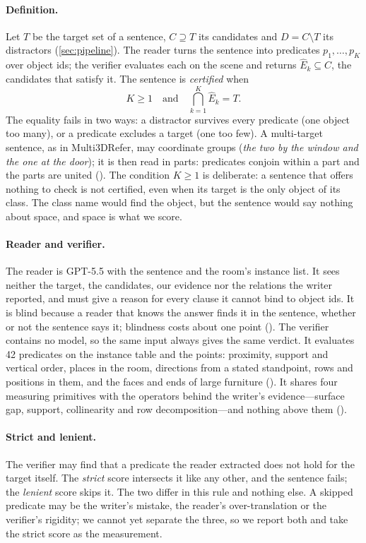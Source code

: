 \paragraph{Definition.}
Let $T$ be the target set of a sentence, $C \supseteq T$ its candidates and $D = C \setminus T$ its distractors (\cref{sec:pipeline}).
The reader turns the sentence into predicates $p_1,\dots,p_K$ over object ids; the verifier evaluates each on the scene and returns $\hat{E}_k \subseteq C$, the candidates that satisfy it.
The sentence is \emph{certified} when
\begin{equation}
  K \ge 1 \quad\text{and}\quad \bigcap_{k=1}^{K} \hat{E}_k = T .
  \label{eq:exact}
\end{equation}
The equality fails in two ways: a distractor survives every predicate (one object too many), or a predicate excludes a target (one too few).
A multi-target sentence, as in Multi3DRefer, may coordinate groups (\emph{the two by the window and the one at the door}); it is then read in parts: predicates conjoin within a part and the parts are united ().
The condition $K \ge 1$ is deliberate: a sentence that offers nothing to check is not certified, even when its target is the only object of its class.
The class name would find the object, but the sentence would say nothing about space, and space is what we score.

\paragraph{Reader and verifier.}
The reader is GPT-5.5 with the sentence and the room's instance list.
It sees neither the target, the candidates, our evidence nor the relations the writer reported, and must give a reason for every clause it cannot bind to object ids.
It is blind because a reader that knows the answer finds it in the sentence, whether or not the sentence says it; blindness costs about one point ().
The verifier contains no model, so the same input always gives the same verdict.
It evaluates 42 predicates on the instance table and the points: proximity, support and vertical order, places in the room, directions from a stated standpoint, rows and positions in them, and the faces and ends of large furniture ().
It shares four measuring primitives with the operators behind the writer's evidence---surface gap, support, collinearity and row decomposition---and nothing above them ().

\paragraph{Strict and lenient.}
The verifier may find that a predicate the reader extracted does not hold for the target itself.
The \emph{strict} score intersects it like any other, and the sentence fails; the \emph{lenient} score skips it.
The two differ in this rule and nothing else.
A skipped predicate may be the writer's mistake, the reader's over-translation or the verifier's rigidity; we cannot yet separate the three, so we report both and take the strict score as the measurement.

